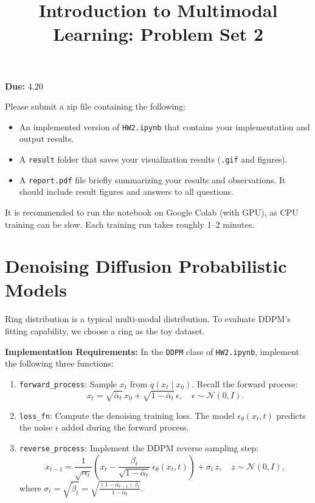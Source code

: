 \documentclass[11pt]{article}
\title{Introduction to Multimodal Learning: Problem Set 2}
\date{}
\begin{document}
\maketitle

\noindent\textbf{Due:} 4.20

\noindent Please submit a zip file containing the following:

\begin{itemize}
    \item An implemented version of \texttt{HW2.ipynb} that contains your implementation and output results.
    \item A \texttt{result} folder that saves your visualization results (\texttt{.gif} and figures).
    \item A \texttt{report.pdf} file briefly summarizing your results and observations. It should include result figures and answers to all questions.
\end{itemize}

\noindent It is recommended to run the notebook on Google Colab (with GPU), as CPU training can be slow. Each training run takes roughly 1--2 minutes.

\section{Denoising Diffusion Probabilistic Models}

Ring distribution is a typical multi-modal distribution. To evaluate DDPM's fitting capability, we choose a ring as the toy dataset.

\textbf{Implementation Requirements:} In the \texttt{DDPM} class of \texttt{HW2.ipynb}, implement the following three functions:

\begin{enumerate}
    \item \texttt{forward\_process}: Sample \( x_t \) from \( q(x_t \mid x_0) \). Recall the forward process:
    \[
    x_t = \sqrt{\bar\alpha_t}\, x_0 + \sqrt{1 - \bar\alpha_t}\, \epsilon, \quad \epsilon \sim \mathcal{N}(0, I).
    \]

    \item \texttt{loss\_fn}: Compute the denoising training loss. The model \( \epsilon_\theta(x_t, t) \) predicts the noise \( \epsilon \) added during the forward process.

    \item \texttt{reverse\_process}: Implement the DDPM reverse sampling step:
    \[
    x_{t-1} = \frac{1}{\sqrt{\alpha_t}} \left( x_t - \frac{\beta_t}{\sqrt{1 - \bar\alpha_t}}\, \epsilon_\theta(x_t, t) \right) + \sigma_t\, z, \quad z \sim \mathcal{N}(0, I),
    \]
    where \( \sigma_t = \sqrt{\tilde\beta_t} = \sqrt{\frac{(1 - \bar\alpha_{t-1})\,\beta_t}{1 - \bar\alpha_t}} \).
\end{enumerate}
\end{document}

